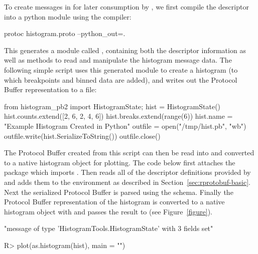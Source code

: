 \documentclass[article]{jss}
\begin{document}
To create 
messages in  for later consumption by , we first compile the 
 descriptor into a python module using the
 compiler:
%
\begin{CodeChunk}
\begin{CodeInput}
protoc histogram.proto --python_out=.
\end{CodeInput}
\end{CodeChunk}
%
This generates a  module called , containing both the 
descriptor information as well as methods to read and manipulate the histogram 
message data.  The following simple  script uses this generated
module to create a histogram (to which breakpoints and binned data are
added), and writes out the Protocol Buffer
representation to a file:
%
\begin{Code}
from histogram_pb2 import HistogramState;
hist = HistogramState()
hist.counts.extend([2, 6, 2, 4, 6])
hist.breaks.extend(range(6))
hist.name = "Example Histogram Created in Python"
outfile = open("/tmp/hist.pb", "wb")
outfile.write(hist.SerializeToString())
outfile.close()
\end{Code}
%
The Protocol Buffer created from this  script can
then be read into  and converted to a native 
histogram object for plotting. The code below first attaches the
 package which imports .  Then
reads all of the  descriptor definitions provided by
 and adds them to the environment as described in
Section~\ref{sec:rprotobuf-basic}.  Next the serialized Protocol
Buffer is parsed using the 
schema.  Finally the Protocol Buffer representation of the histogram
is converted to a native  histogram object with
 and passes the result to  (see
Figure~\ref{figure}).
%
\begin{CodeChunk}
\begin{CodeOutput}
[1] "message of type 'HistogramTools.HistogramState' with 3 fields set"
\end{CodeOutput}
\begin{CodeInput}
R> plot(as.histogram(hist), main = "")
\end{CodeInput}
\end{CodeChunk}
\end{document}

